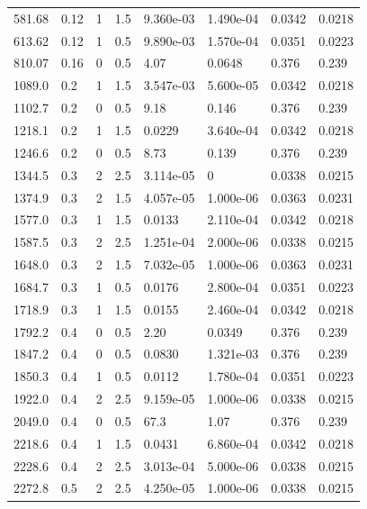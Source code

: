 \documentclass[preview]{standalone}
\begin{document}
{{\begin{tabular}{L{1.2cm}C{1.2cm} C{0.3cm}C{0.5cm} C{1.4cm}C{1.4cm} C{1.4cm}C{1.4cm}}
  581.68  &  0.12  & 1     & 1.5 &  9.360e-03  & 1.490e-04  & 0.0342 &  0.0218   \\ 
  613.62  &  0.12  & 1     & 0.5 &  9.890e-03  & 1.570e-04  & 0.0351 &  0.0223   \\ 
  810.07  &  0.16  & 0     & 0.5 &  4.07  & 0.0648  & 0.376 &  0.239   \\ 
  1089.0  &   0.2  & 1     & 1.5 &  3.547e-03  & 5.600e-05  & 0.0342 &  0.0218   \\ 
  1102.7  &   0.2  & 0     & 0.5 &  9.18  & 0.146  & 0.376 &  0.239   \\ 
  1218.1  &   0.2  & 1     & 1.5 &  0.0229  & 3.640e-04  & 0.0342 &  0.0218   \\ 
  1246.6  &   0.2  & 0     & 0.5 &  8.73  & 0.139  & 0.376 &  0.239   \\ 
  1344.5  &   0.3  & 2     & 2.5 &  3.114e-05  & 0  & 0.0338 &  0.0215   \\ 
  1374.9  &   0.3  & 2     & 1.5 &  4.057e-05  & 1.000e-06  & 0.0363 &  0.0231   \\ 
  1577.0  &   0.3  & 1     & 1.5 &  0.0133  & 2.110e-04  & 0.0342 &  0.0218   \\ 
  1587.5  &   0.3  & 2     & 2.5 &  1.251e-04  & 2.000e-06  & 0.0338 &  0.0215   \\ 
  1648.0  &   0.3  & 2     & 1.5 &  7.032e-05  & 1.000e-06  & 0.0363 &  0.0231   \\ 
  1684.7  &   0.3  & 1     & 0.5 &  0.0176  & 2.800e-04  & 0.0351 &  0.0223   \\ 
  1718.9  &   0.3  & 1     & 1.5 &  0.0155  & 2.460e-04  & 0.0342 &  0.0218   \\ 
  1792.2  &   0.4  & 0     & 0.5 &  2.20  & 0.0349  & 0.376 &  0.239   \\ 
  1847.2  &   0.4  & 0     & 0.5 &  0.0830  & 1.321e-03  & 0.376 &  0.239   \\ 
  1850.3  &   0.4  & 1     & 0.5 &  0.0112  & 1.780e-04  & 0.0351 &  0.0223   \\ 
  1922.0  &   0.4  & 2     & 2.5 &  9.159e-05  & 1.000e-06  & 0.0338 &  0.0215   \\ 
  2049.0  &   0.4  & 0     & 0.5 &  67.3  & 1.07  & 0.376 &  0.239   \\ 
  2218.6  &   0.4  & 1     & 1.5 &  0.0431  & 6.860e-04  & 0.0342 &  0.0218   \\ 
  2228.6  &   0.4  & 2     & 2.5 &  3.013e-04  & 5.000e-06  & 0.0338 &  0.0215   \\ 
  2272.8  &   0.5  & 2     & 2.5 &  4.250e-05  & 1.000e-06  & 0.0338 &  0.0215   \\ 

\end{tabular}}}
\end{document}
